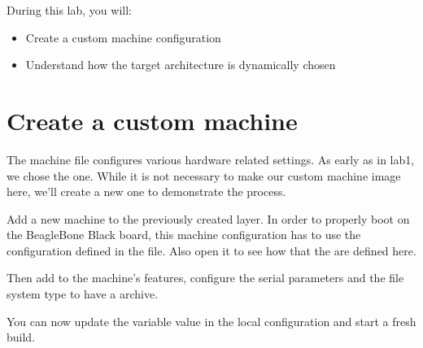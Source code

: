 
During this lab, you will:
\begin{itemize}
  \item Create a custom machine configuration
  \item Understand how the target architecture is dynamically chosen
\end{itemize}

\section{Create a custom machine}

The machine file configures various hardware related settings. As early as in
lab1, we chose the  one. While it is not necessary to
make our custom machine image here, we'll create a new one to demonstrate the
process.

Add a new  machine to the previously created layer. In order to
properly boot on the BeagleBone Black board, this machine configuration has to
use the configuration defined in the  file. Also open it to see how
that the  are defined here.

Then add \code{} to the machine's features, configure the serial parameters
and the file system type to have a  archive.

You can now update the  variable value in the local configuration
and start a fresh build.

\section{}
